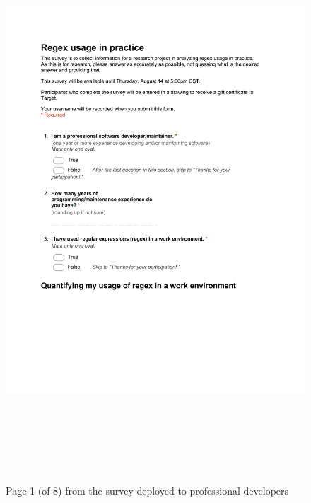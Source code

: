 \begin{figure}[!htbp]
   \centering
       \includegraphics[page=1, height=21cm,keepaspectratio]{nontex/appendix/regexUsageInPracticeSurvey}
 \caption{Page 1 (of 8) from the survey deployed to professional developers}
 \label{fig:surveyPDF1}
\end{figure}
